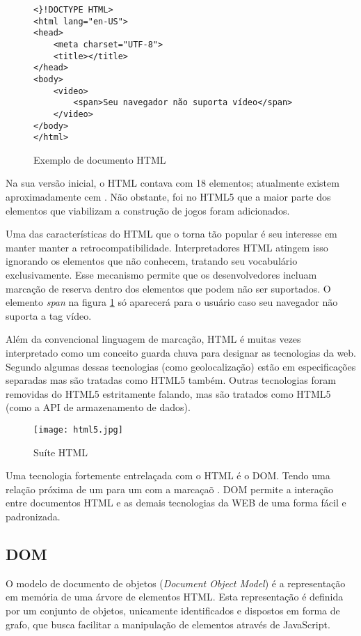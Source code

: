 \begin{figure}[H]
\centering
\begin{verbatim}
<}!DOCTYPE HTML>
<html lang="en-US">
<head>
	<meta charset="UTF-8">
	<title></title>
</head>
<body>
    <video>
        <span>Seu navegador não suporta vídeo</span>
    </video>
</body>
</html>
\end{verbatim}
\caption{Exemplo de documento HTML}
\label{fig:htmlSample}
\end{figure}

Na sua versão inicial, o HTML contava com 18 elementos; atualmente
existem aproximadamente cem \autocite{diveIntohtml}. Não obstante, foi
no HTML5 que a maior parte dos elementos que viabilizam a construção
de jogos foram adicionados.

Uma das características do HTML que o torna tão popular é seu
interesse em manter manter a retrocompatibilidade. Interpretadores
HTML atingem isso ignorando os elementos que não conhecem, tratando
seu vocabulário exclusivamente. Esse mecanismo permite que os
desenvolvedores incluam marcação de reserva dentro dos elementos
que podem não ser suportados. O elemento \textit{span} na figura
\ref{fig:htmlSample} só aparecerá para o usuário caso seu navegador
não suporta a tag vídeo.

Além da convencional linguagem de marcação, HTML é muitas vezes
interpretado como um conceito guarda chuva para designar as tecnologias
da web. Segundo \autocite{diveIntohtml} algumas dessas tecnologias (como geolocalização) estão em especificações separadas mas são tratadas como HTML5 também. Outras
tecnologias foram removidas do HTML5 estritamente falando, mas são tratados
como HTML5 (como a API de armazenamento de dados).

\begin{figure}[H]
    \centering
    \texttt{[image: html5.jpg]}
    \caption{Suíte HTML}
\end{figure}

Uma tecnologia fortemente entrelaçada com o HTML é o DOM.
Tendo uma relação próxima de um para um com a marcaçaõ
\autocite{howBrowsersWork}. DOM permite a interação entre documentos
HTML e as demais tecnologias da WEB de uma forma fácil e padronizada.

\subsection{DOM}

O modelo de documento de objetos (\textit{Document Object Model}) é
a representação em memória de uma árvore de elementos HTML. Esta
representação é definida por um conjunto de objetos, unicamente
identificados e dispostos em forma de grafo, que busca facilitar a
manipulação de elementos através de JavaScript.

